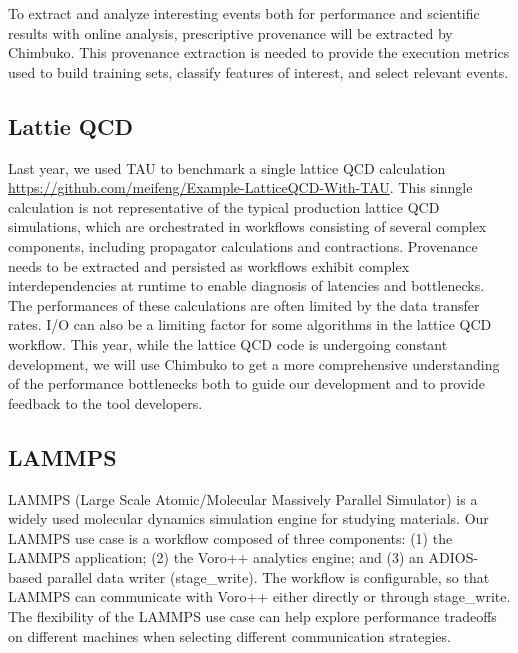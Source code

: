To extract and analyze interesting events both for performance and scientific results with online analysis, prescriptive provenance will be extracted by Chimbuko.  This provenance extraction is needed to provide the execution metrics used to build training sets, classify features of interest, and select relevant events. 

\subsection{Lattie QCD}
Last year, we used TAU to benchmark a single lattice QCD calculation \url{https://github.com/meifeng/Example-LatticeQCD-With-TAU}.   This sinngle calculation is not representative of the typical production lattice QCD simulations, which are orchestrated in workflows consisting of several complex components, including propagator calculations and contractions. Provenance needs to be extracted and persisted as workflows exhibit complex interdependencies at runtime to enable diagnosis of latencies and bottlenecks. The performances of these calculations are often limited by the data transfer rates. I/O can also be a limiting factor for some algorithms in the lattice QCD workflow. This year, while the lattice QCD code is undergoing constant development, we will use Chimbuko to get a more comprehensive understanding of the performance bottlenecks both to guide our development and to provide feedback to the tool developers.

\subsection {LAMMPS}
LAMMPS (Large Scale Atomic/Molecular Massively Parallel Simulator) is a widely used molecular dynamics simulation engine for studying materials. Our LAMMPS use case is a workflow composed of three components: (1) the LAMMPS application; (2) the Voro++ analytics engine; and (3) an ADIOS-based parallel data writer (stage\_write). The workflow is configurable, so that LAMMPS can communicate with Voro++ either directly or through stage\_write. The flexibility of the LAMMPS use case can help explore performance tradeoffs on different machines when selecting different communication strategies.

